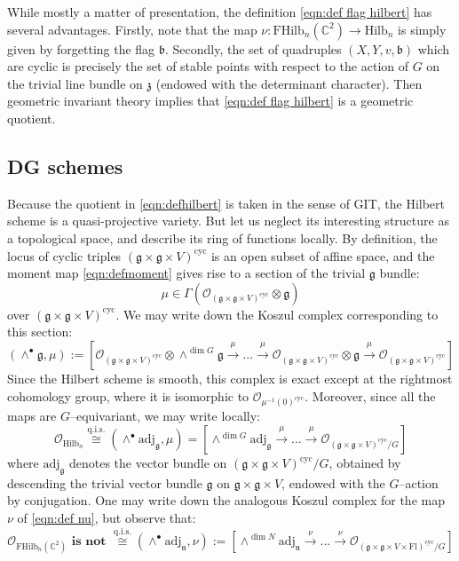 \documentclass[12pt]{amsart}
\numberwithin{equation}{section}
\theoremstyle{definition}
\theoremstyle{remark}
\newcommand{\CC}{\mathbb{C}}
\newcommand{\CO}{\mathcal{O}}
\renewcommand{\1}{\mathbf{1}}
\newcommand{\cyc}{\text{cyc}}
\newcommand{\fl}{\text{Fl}}
\newcommand{\FH}{\mathrm{FHilb}}
\renewcommand{\H}{\mathrm{Hilb}}
\newcommand{\qis}{\mathrm{q.i.s.}}
\newcommand{\fg}{\mathfrak{g}}
\newcommand{\fb}{\mathfrak{b}}
\newcommand{\fn}{\mathfrak{n}}
\newcommand{\fz}{\mathfrak{z}}
\newcommand{\adj}{\mathrm{adj}}
\begin{document}
While mostly a matter of presentation, the definition \eqref{eqn:def flag hilbert} has several advantages. Firstly, note that the map $\nu:\FH_n(\CC^2) \rightarrow \H_n$ is simply given by forgetting the flag $\fb$. Secondly, the set of quadruples $(X,Y,v,\fb)$ which are cyclic is precisely the set of stable points with respect to the action of $G$ on the trivial line bundle on $\fz$ (endowed with the determinant character). Then geometric invariant theory implies that \eqref{eqn:def flag hilbert} is a geometric quotient.

\subsection{DG schemes}
\label{sub:dg schemes}

Because the quotient in \eqref{eqn:defhilbert} is taken in the sense of GIT, the Hilbert scheme is a quasi-projective variety. But let us neglect its interesting structure as a topological space, and describe its ring of functions locally. By definition, the locus of cyclic triples $(\fg \times \fg \times V)^\cyc$ is an open subset of affine space, and the moment map \eqref{eqn:defmoment} gives rise to a section of the trivial $\fg$ bundle:
$$
\mu \in \Gamma \left( \CO_{(\fg \times \fg \times V)^\cyc} \otimes \fg \right)
$$
over $(\fg \times \fg \times V)^\cyc$. We may write down the Koszul complex corresponding to this section:
$$
\left( \wedge^\bullet \fg, \mu \right) := \left[ \CO_{(\fg \times \fg \times V)^\cyc} \otimes \wedge^{\dim G} \fg \stackrel{\mu}\longrightarrow ... \stackrel{\mu}\longrightarrow \CO_{(\fg \times \fg \times V)^\cyc} \otimes \fg \stackrel{\mu}\longrightarrow \CO_{(\fg \times \fg \times V)^\cyc} \right]
$$
Since the Hilbert scheme is smooth, this complex is exact except at the rightmost cohomology group, where it is isomorphic to $\CO_{\mu^{-1}(0)^\cyc}$. Moreover, since all the maps are $G$--equivariant, we may write locally:
$$
\CO_{\H_n} \stackrel{\qis}\cong \left( \wedge^\bullet \adj_\fg, \mu \right) = \left[ \wedge^{\dim G} \adj_\fg \stackrel{\mu}\longrightarrow ... \stackrel{\mu}\longrightarrow \CO_{(\fg \times \fg \times V)^\cyc/G} \right]
$$
where $\adj_\fg$ denotes the vector bundle on $(\fg \times \fg \times V)^\cyc/G$, obtained by descending the trivial vector bundle $\fg$ on $\fg \times \fg \times V$, endowed with the $G$--action by conjugation. One may write down the analogous Koszul complex for the map $\nu$ of \eqref{eqn:def nu}, but observe that:
\begin{equation}
\label{eqn:koszul flag}
\CO_{\FH_n(\CC^2)} \textbf{ is not } \stackrel{\qis}\cong \left( \wedge^\bullet \adj_\fn, \nu \right) := \left[ \wedge^{\dim N} \adj_\fn \stackrel{\nu}\longrightarrow ... \stackrel{\nu}\longrightarrow \CO_{(\fg \times \fg \times V \times \fl)^\cyc/G} \right]
\end{equation}
\end{document}
